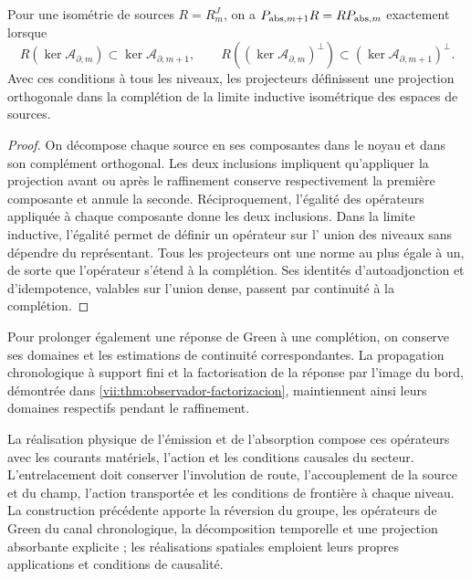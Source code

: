 \begin{proposition}
\label{vii:prop:naturalidad-proyeccion-absorcion}
Pour une isométrie de sources \(R=R_m^J\), on a \(P_{{\rm abs},m+1}R=RP_{{\rm abs},m}\) exactement lorsque
\[
 R(\ker\mathcal A_{\partial,m})
       \subset\ker\mathcal A_{\partial,m+1},\qquad
 R((\ker\mathcal A_{\partial,m})^\perp)
       \subset(\ker\mathcal A_{\partial,m+1})^\perp.
\]
Avec ces conditions à tous les niveaux, les projecteurs définissent une projection orthogonale dans la complétion de la limite inductive isométrique des espaces de sources.
\end{proposition}
\begin{proof}
On décompose chaque source en ses composantes dans le noyau et dans son
complément orthogonal. Les deux inclusions impliquent qu'appliquer la
projection avant ou après le raffinement conserve respectivement la
première composante et annule la seconde. Réciproquement, l'égalité des
opérateurs appliquée à chaque composante donne les deux inclusions.
Dans la limite inductive, l'égalité permet de définir un opérateur sur l'
union des niveaux sans dépendre du représentant. Tous les projecteurs
ont une norme au plus égale à un, de sorte que l'opérateur s'étend à la
complétion. Ses identités d'autoadjonction et d'idempotence, valables sur
l'union dense, passent par continuité à la complétion.
\end{proof}

Pour prolonger également une réponse de Green à une complétion, on
conserve ses domaines et les estimations de continuité correspondantes.
La propagation chronologique à support fini et la factorisation de la
réponse par l'image du bord, démontrée dans
\ref{vii:thm:observador-factorizacion}, maintiennent ainsi leurs domaines
respectifs pendant le raffinement.

La réalisation physique de l'émission et de l'absorption compose ces opérateurs avec les courants matériels, l'action et les conditions causales du secteur. L'entrelacement doit conserver l'involution de route, l'accouplement de la source et du champ, l'action transportée et les conditions de frontière à chaque niveau. La construction précédente apporte la réversion du groupe, les opérateurs de Green du canal chronologique, la décomposition temporelle et une projection absorbante explicite ; les réalisations spatiales emploient leurs propres applications et conditions de causalité.
